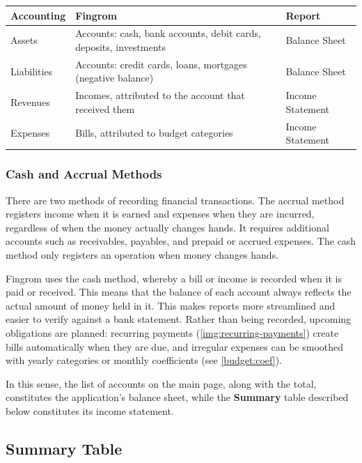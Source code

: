 \begin{center}
\begin{tabularx}{\textwidth}{|l|X|l|}
  \hline
  \textbf{Accounting} & \textbf{Fingrom} & \textbf{Report} \\
  \hline
  Assets & Accounts: cash, bank accounts, debit cards, deposits, investments & Balance Sheet \\
  \hline
  Liabilities & Accounts: credit cards, loans, mortgages (negative balance) & Balance Sheet \\
  \hline
  Revenues & Incomes, attributed to the account that received them & Income Statement \\
  \hline
  Expenses & Bills, attributed to budget categories & Income Statement \\
  \hline
\end{tabularx}
\end{center}


\subsubsection{Cash and Accrual Methods}

There are two methods of recording financial transactions. The accrual method registers
income when it is earned and expenses when they are incurred, regardless of when the money
actually changes hands. It requires additional accounts such as receivables, payables, and
prepaid or accrued expenses. The cash method only registers an operation when money changes
hands.

Fingrom uses the cash method, whereby a bill or income is recorded when it is paid or
received. This means that the balance of each account always reflects the actual amount of
money held in it. This makes reports more streamlined and easier to verify against a bank
statement. Rather than being recorded, upcoming obligations are planned: recurring payments
(\cref{img:recurring-payments}) create bills automatically when they are due, and irregular
expenses can be smoothed with yearly categories or monthly coefficients
(see \cref{budget:coef}).


\noindent In this sense, the list of accounts on the main page, along with the total,
constitutes the application's balance sheet, while the \textbf{Summary} table described below
constitutes its income statement.


\subsection{Summary Table}
\label{summary:table}

